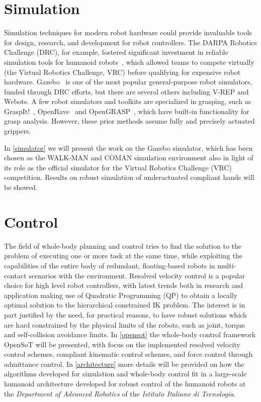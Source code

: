 \documentclass[%
	paper=A4,					%
	twoside=true,				%
	openright,			.
	parskip=full,				%
	chapterprefix=true,			%
	11pt,						%
	headings=normal,			%
	bibliography=totoc,			%
	listof=totoc,				%
	titlepage=on,				%
	captions=tableabove,		%
	draft=false,				%
]{scrreprt}%
\begin{document}
\section{Simulation}
Simulation techniques for modern robot hardware could provide invaluable tools for design, research, and development for robot controllers.  The DARPA Robotics Challenge (DRC), for example, fostered significant investment in reliable simulation tools for humanoid robots~\cite{Hsu14}, which allowed teams to compete virtually (the Virtual Robotics Challenge, VRC) before qualifying for expensive robot hardware.  Gazebo~\cite{Koenig08} is one of the most popular general-purpose robot simulators, funded through DRC efforts, but there are several others including V-REP and Webots.  A few robot simulators and toolkits are specialized in grasping, such as GraspIt!~\cite{Miller04}, OpenRave~\cite{Diankov08OpenRAVE} and OpenGRASP~\cite{Leon10OpenGRASP}, which have built-in functionality for grasp analysis. However, these prior methods assume fully and precisely actuated grippers. 

In \ref{simulator} we will present the work on the Gazebo simulator, which has been chosen as the WALK-MAN and COMAN simulation environment also in light of its role as the official simulator for the Virtual Robotics Challenge (VRC) competition. Results on robust simulation of underactuated compliant hands will be showed.

\section{Control}
The field of whole-body planning and control tries to find the solution to the problem of executing one or more task at the same time, while exploiting the capabilities of the entire body of redundant, floating-based robots in multi-contact scenarios with the environment.
Resolved velocity control is a popular choice for high level robot controllers, with latest trends both in research and application making use of Quadratic Programming (QP) to obtain a locally optimal solution to the hierarchical constrained IK problem. The interest is in part justified by the need, for practical reasons, to have robust solutions which are hard constrained by the physical limits of the robots, such as joint, torque and self-collision avoidance limits.
In \ref{opensot} the whole-body control framework OpenSoT will be presented, with focus on the implemented resolved velocity control schemes, compliant kinematic control schemes, and force control through admittance control. In \ref{architecture} more details will be provided on how the algorithms developed for simulation and whole-body control fit in a large-scale humanoid architecture developed for robust control of the humanoid robots at the \emph{Department of Advanced Robotics} of the \emph{Istituto Italiano di Tecnologia}.
\end{document}

